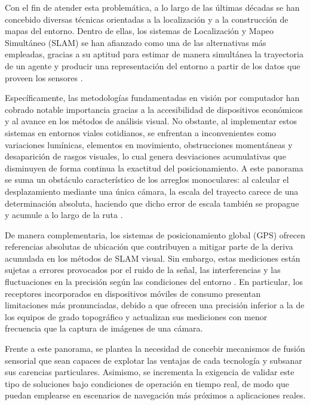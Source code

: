 Con el fin de atender esta problemática, a lo largo de las últimas décadas se han concebido diversas técnicas orientadas a la localización y a la construcción de mapas del entorno.
Dentro de ellas, los sistemas de Localización y Mapeo Simultáneo (SLAM) se han afianzado como una de las alternativas más empleadas, gracias a su aptitud para estimar de manera simultánea la trayectoria de un agente y producir una representación del entorno a partir de los datos que proveen los sensores \cite{cadena2016slam}.

Específicamente, las metodologías fundamentadas en visión por computador han cobrado notable importancia gracias a la accesibilidad de dispositivos económicos y al avance en los métodos de análisis visual.
No obstante, al implementar estos sistemas en entornos viales cotidianos, se enfrentan a inconvenientes como variaciones lumínicas, elementos en movimiento, obstrucciones momentáneas y desaparición de rasgos visuales, lo cual genera desviaciones acumulativas que disminuyen de forma continua la exactitud del posicionamiento.
A este panorama se suma un obstáculo característico de los arreglos monoculares: al calcular el desplazamiento mediante una única cámara, la escala del trayecto carece de una determinación absoluta, haciendo que dicho error de escala también se propague y acumule a lo largo de la ruta \cite{murartal2015orbslam}.

De manera complementaria, los sistemas de posicionamiento global (GPS) ofrecen referencias absolutas de ubicación que contribuyen a mitigar parte de la deriva acumulada en los métodos de SLAM visual.
Sin embargo, estas mediciones están sujetas a errores provocados por el ruido de la señal, las interferencias y las fluctuaciones en la precisión según las condiciones del entorno \cite{groves2013gnss}.
En particular, los receptores incorporados en dispositivos móviles de consumo presentan limitaciones más pronunciadas, debido a que ofrecen una precisión inferior a la de los equipos de grado topográfico y actualizan sus mediciones con menor frecuencia que la captura de imágenes de una cámara.

Frente a este panorama, se plantea la necesidad de concebir mecanismos de fusión sensorial que sean capaces de explotar las ventajas de cada tecnología y subsanar sus carencias particulares.
Asimismo, se incrementa la exigencia de validar este tipo de soluciones bajo condiciones de operación en tiempo real, de modo que puedan emplearse en escenarios de navegación más próximos a aplicaciones reales.

